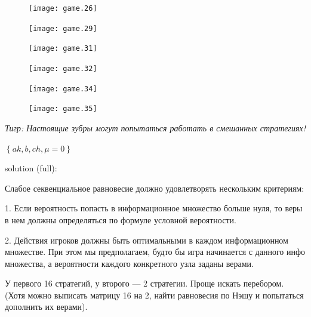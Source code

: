 \begin{problem}[Лес ]
\begin{figure}[htbp]
      \texttt{[image: game.26]}
\end{figure}

\begin{figure}[htbp]
     \texttt{[image: game.29]}
\end{figure}

\begin{figure}[htbp]
     \texttt{[image: game.31]}
\end{figure}

\begin{figure}[htbp]
     \texttt{[image: game.32]}
\end{figure}

\begin{figure}[htbp]
     \texttt{[image: game.34]}
\end{figure}


\begin{figure}[htbp]
     \texttt{[image: game.35]}
\end{figure}




{\it Тигр: Настоящие зубры могут попытаться работать в смешанных стратегиях!}\par




\begin{sol}

  $\left\{ak,b,ch,\mu =0\right\}$\par

solution (full): \par
Слабое секвенциальное равновесие должно удовлетворять нескольким критериям: \par
1. Если вероятность попасть в информационное множество больше нуля, то веры в нем должны определяться по формуле условной вероятности. \par
2. Действия игроков должны быть оптимальными в каждом информационном множестве. При этом мы предполагаем, будто бы игра начинается с данного инфо множества, а вероятности каждого конкретного узла заданы верами.\par

У первого 16 стратегий, у второго — 2 стратегии. Проще искать перебором. (Хотя можно выписать матрицу 16 на 2, найти равновесия по Нэшу и попытаться дополнить их верами).\par


\end{sol}
\end{problem}
